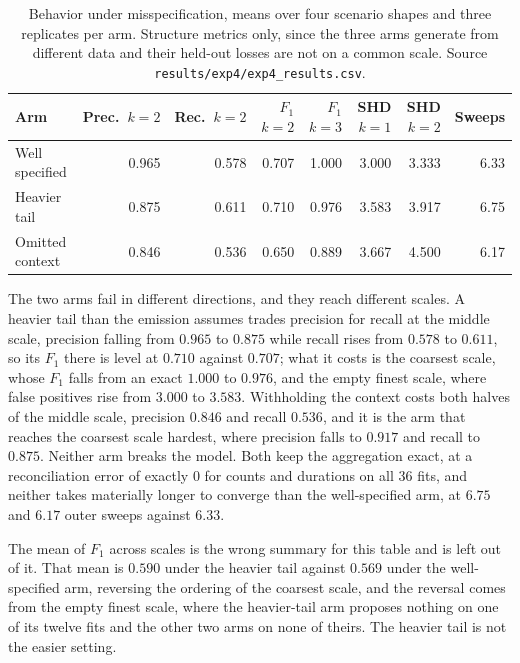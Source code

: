 \begin{table}[t]
\centering
\caption{Behavior under misspecification, means over four scenario shapes and
three replicates per arm. Structure metrics only, since the three arms generate
from different data and their held-out losses are not on a common scale. Source
\texttt{results/exp4/exp4\_results.csv}.}
\label{tab:results:misspec}
\small
\begin{tabular}{lrrrrrrr}
\toprule
Arm & Prec.\ $k{=}2$ & Rec.\ $k{=}2$ & $F_1$ $k{=}2$ & $F_1$ $k{=}3$ & SHD $k{=}1$ & SHD $k{=}2$ & Sweeps \\
\midrule
Well specified   & 0.965 & 0.578 & 0.707 & 1.000 & 3.000 & 3.333 & 6.33 \\
Heavier tail     & 0.875 & 0.611 & 0.710 & 0.976 & 3.583 & 3.917 & 6.75 \\
Omitted context  & 0.846 & 0.536 & 0.650 & 0.889 & 3.667 & 4.500 & 6.17 \\
\bottomrule
\end{tabular}
\end{table}

The two arms fail in different directions, and they reach different scales. A
heavier tail than the emission assumes trades precision for recall at the middle
scale, precision falling from $0.965$ to $0.875$ while recall rises from $0.578$
to $0.611$, so its $F_1$ there is level at $0.710$ against $0.707$; what it costs
is the coarsest scale, whose $F_1$ falls from an exact $1.000$ to $0.976$, and
the empty finest scale, where false positives rise from $3.000$ to $3.583$.
Withholding the context costs both halves of the middle scale, precision
$0.846$ and recall $0.536$, and it is the arm that reaches the coarsest scale
hardest, where precision falls to $0.917$ and recall to $0.875$. Neither arm
breaks the model. Both keep the aggregation exact, at a reconciliation error of
exactly $0$ for counts and durations on all $36$ fits, and neither takes
materially longer to converge than the well-specified arm, at $6.75$ and $6.17$
outer sweeps against $6.33$.

The mean of $F_1$ across scales is the wrong summary for this table and is left
out of it. That mean is $0.590$ under the heavier tail against $0.569$ under the
well-specified arm, reversing the ordering of the coarsest scale, and the
reversal comes from the empty finest scale, where the heavier-tail arm proposes
nothing on one of its twelve fits and the other two arms on none of theirs. The
heavier tail is not the easier setting.

